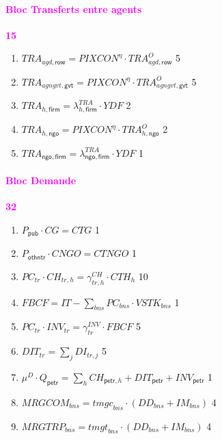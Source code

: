 \documentclass[11pt,a4paper]{article}
\newcommand{\agd}{\mathit{agd}}
\newcommand{\agngvt}{\mathit{agngvt}}
\newcommand{\bns}{\mathit{bns}}
\newcommand{\firm}{\mathsf{firm}}
\newcommand{\gvt}{\mathsf{gvt}}
\newcommand{\ngo}{\mathsf{ngo}}
\newcommand{\othntr}{\mathsf{othntr}}
\newcommand{\petr}{\mathsf{petr}}
\newcommand{\pub}{\mathsf{pub}}
\newcommand{\row}{\mathsf{row}}
\newcommand{\tmgc}{\mathit{tmgc}}
\newcommand{\tmgt}{\mathit{tmgt}}
\newcommand{\tr}{\mathit{tr}}
\newcommand{\CG}{\mathit{CG}}
\newcommand{\CH}{\mathit{CH}}
\newcommand{\CNGO}{\mathit{CNGO}}
\newcommand{\CTG}{\mathit{CTG}}
\newcommand{\CTH}{\mathit{CTH}}
\newcommand{\CTNGO}{\mathit{CTNGO}}
\newcommand{\DD}{\mathit{DD}}
\newcommand{\DI}{\mathit{DI}}
\newcommand{\DIT}{\mathit{DIT}}
\newcommand{\FBCF}{\mathit{FBCF}}
\newcommand{\IM}{\mathit{IM}}
\newcommand{\INV}{\mathit{INV}}
\newcommand{\IT}{\mathit{IT}}
\newcommand{\MRGCOM}{\mathit{MRGCOM}}
\newcommand{\MRGTRP}{\mathit{MRGTRP}}
\newcommand{\PC}{\mathit{PC}}
\newcommand{\PIXCON}{\mathit{PIXCON}}
\newcommand{\TRA}{\mathit{TRA}}
\newcommand{\VSTK}{\mathit{VSTK}}
\newcommand{\YDF}{\mathit{YDF}}
\newcommand{\redparagraph}[1]{\paragraph*{\large\textcolor{Fuchsia}{#1}}}
\begin{document}
	\redparagraph{Bloc Transferts entre agents}\hfill \textcolor{Fuchsia}{\textbf{15}}
	\begin{enumerate}[itemsep=2pt,label=\textbf{eq\arabic*}.,resume,  ref=\textbf{eq\arabic*}]	
			
		\item $\TRA_{\agd,\row} = \PIXCON^\eta\cdot\TRA_{\agd,\row}^{O}$ \hfill 5
		
		\item $\TRA_{\agngvt,\gvt} = \PIXCON^\eta\cdot\TRA_{\agngvt,\gvt}^{O}$ \hfill 5
		
		
		\item $\TRA_{h,\firm} = \lambda^{\TRA}_{h,\firm} \cdot\YDF$ \hfill 2		
		
		\item $\TRA_{h,\ngo} = \PIXCON^\eta\cdot\TRA_{h,\ngo}^{O}$ \hfill 2
		
		\item $\TRA_{\ngo,\firm} = \lambda^{\TRA}_{\ngo,\firm} \cdot\YDF$  \hfill 1	
			
	\end{enumerate}
	
	\redparagraph{Bloc Demande}\hfill \textcolor{Fuchsia}{\textbf{32}}
	\begin{enumerate}[itemsep=2pt,label=\textbf{eq\arabic*}.,resume,ref=\textbf{eq\arabic*}]
				
		\item $P_{\pub}\cdot \CG = \CTG$ \hfill 1
		
		\item $P_{\othntr}\cdot \CNGO = \CTNGO$ \hfill 1
		
		\item $\PC_{tr}\cdot\CH_{\tr,h}  = \gamma^{\CH}_{\tr,h} \cdot \CTH_h$   \label{it:CHtrh} \hfill  10
		
		\item $\FBCF = \IT - \sum_{\bns}\PC_{\bns}\cdot\VSTK_{\bns}$ \hfill 1
		
		\item $\PC_{tr}\cdot\INV_{\tr}   = \gamma^{\INV}_{\tr} \cdot \FBCF$   \label{it:INV} \hfill 5 
		
		\item $\DIT_{\tr} = \sum_{j} \DI_{\tr,j}$ \hfill 5
		
		\item $\mu^{D}\cdot Q_{\petr} = \sum_{h} \CH_{\petr,h} + \DIT_{\petr}  + \INV_{\petr}$  \label{it:muDQ}\hfill 1
		
		\item $\MRGCOM_{\bns} = \tmgc_{\bns} \cdot \left(\DD_{\bns} + \IM_{\bns}\right)$ \label{it:MGCOM}  \hfill 4
		
		\item $\MRGTRP_{\bns} = \tmgt_{\bns} \cdot \left( \DD_{\bns} + \IM_{\bns}\right)$  \label{it:MGTRP} \hfill 4
		
				
	\end{enumerate}
	
\end{document}
